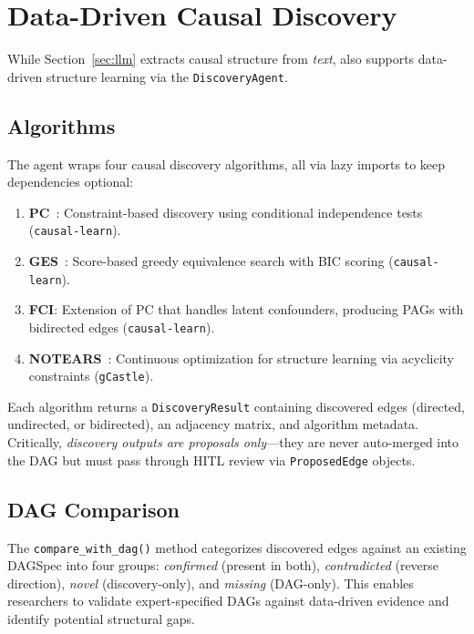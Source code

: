 \documentclass{article}
\begin{document}
\section{Data-Driven Causal Discovery}
\label{sec:discovery}

While Section~\ref{sec:llm} extracts causal structure from \emph{text}, \oc{} also supports data-driven structure learning via the \texttt{DiscoveryAgent}.

\subsection{Algorithms}

The agent wraps four causal discovery algorithms, all via lazy imports to keep dependencies optional:

\begin{enumerate}[leftmargin=*, itemsep=1pt]
    \item \textbf{PC}~\citep{spirtes2000causation}: Constraint-based discovery using conditional independence tests (\texttt{causal-learn}).
    \item \textbf{GES}~\citep{chickering2002optimal}: Score-based greedy equivalence search with BIC scoring (\texttt{causal-learn}).
    \item \textbf{FCI}: Extension of PC that handles latent confounders, producing PAGs with bidirected edges (\texttt{causal-learn}).
    \item \textbf{NOTEARS}~\citep{zheng2018dags}: Continuous optimization for structure learning via acyclicity constraints (\texttt{gCastle}).
\end{enumerate}

Each algorithm returns a \texttt{DiscoveryResult} containing discovered edges (directed, undirected, or bidirected), an adjacency matrix, and algorithm metadata. Critically, \emph{discovery outputs are proposals only}---they are never auto-merged into the DAG but must pass through HITL review via \texttt{ProposedEdge} objects.

\subsection{DAG Comparison}

The \texttt{compare\_with\_dag()} method categorizes discovered edges against an existing DAGSpec into four groups: \emph{confirmed} (present in both), \emph{contradicted} (reverse direction), \emph{novel} (discovery-only), and \emph{missing} (DAG-only). This enables researchers to validate expert-specified DAGs against data-driven evidence and identify potential structural gaps.
\end{document}
